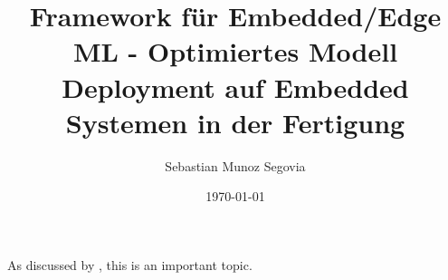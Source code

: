\documentclass[a4paper]{report}
\begin{document}
\title{Framework für Embedded/Edge ML - Optimiertes Modell Deployment auf Embedded Systemen in der Fertigung}
\author{Sebastian Munoz Segovia}
\date{\today}
\maketitle

\tableofcontents
\listoffigures
\listoftables










\appendix


As discussed by \cite{smith2024}, this is an important topic.



\end{document}
